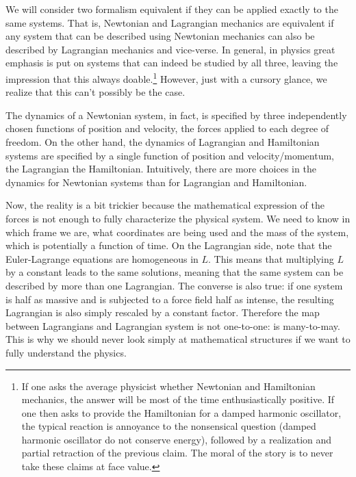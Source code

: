 We will consider two formalism equivalent if they can be applied exactly to the same systems. That is, Newtonian and Lagrangian mechanics are equivalent if any system that can be described using Newtonian mechanics can also be described by Lagrangian mechanics and vice-verse. In general, in physics great emphasis is put on systems that can indeed be studied by all three, leaving the impression that this always doable.\footnote{If one asks the average physicist whether Newtonian and Hamiltonian mechanics, the answer will be most of the time enthusiastically positive. If one then asks to provide the Hamiltonian for a damped harmonic oscillator, the typical reaction is annoyance to the nonsensical question (damped harmonic oscillator do not conserve energy), followed by a realization and partial retraction of the previous claim. The moral of the story is to never take these claims at face value.} However, just with a cursory glance, we realize that this can't possibly be the case.

The dynamics of a Newtonian system, in fact, is specified by three independently chosen functions of position and velocity, the forces applied to each degree of freedom. On the other hand, the dynamics of Lagrangian and Hamiltonian systems are specified by a single function of position and velocity/momentum, the Lagrangian the Hamiltonian. Intuitively, there are more choices in the dynamics for Newtonian systems than for Lagrangian and Hamiltonian.

Now, the reality is a bit trickier because the mathematical expression of the forces is not enough to fully characterize the physical system. We need to know in which frame we are, what coordinates are being used and the mass of the system, which is potentially a function of time. On the Lagrangian side, note that the Euler-Lagrange equations are homogeneous in $L$. This means that multiplying $L$ by a constant leads to the same solutions, meaning that the same system can be described by more than one Lagrangian. The converse is also true: if one system is half as massive and is subjected to a force field half as intense, the resulting Lagrangian is also simply rescaled by a constant factor. Therefore the map between Lagrangians and Lagrangian system is not one-to-one: is many-to-may. This is why we should never look simply at mathematical structures if we want to fully understand the physics.

